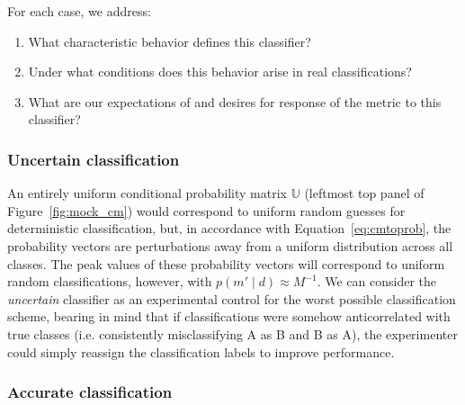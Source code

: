 For each case, we address:
\begin{enumerate}
  \item What characteristic behavior defines this classifier?
  \item Under what conditions does this behavior arise in real classifications?
  \item What are our expectations of and desires for response of the metric to this classifier?
\end{enumerate}

\subsubsection{Uncertain classification}
\label{sec:uncertaindata}

An entirely uniform conditional probability matrix $\mathbb{U}$ (leftmost top panel of Figure~\ref{fig:mock_cm}) would correspond to uniform random guesses for deterministic classification, but, in accordance with Equation~\ref{eq:cmtoprob}, the probability vectors are perturbations away from a uniform distribution across all classes.
The peak values of these probability vectors will correspond to uniform random classifications, however, with $p(m' \mid d)\approx M^{-1}$.
We can consider the \textit{uncertain} classifier as an experimental control for the worst possible classification scheme, bearing in mind that if classifications were somehow anticorrelated with true classes (i.e. consistently misclassifying A as B and B as A), the experimenter could simply reassign the classification labels to improve performance.

\subsubsection{Accurate classification}
\label{sec:accuratedata}

